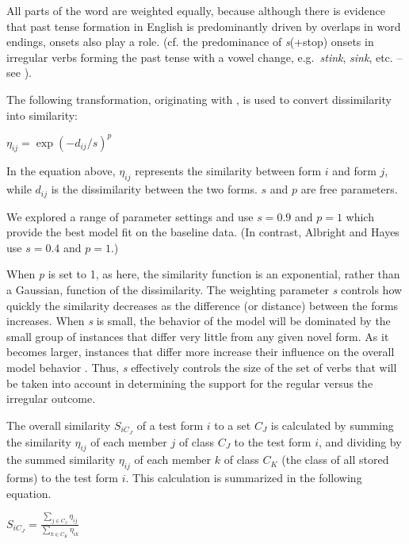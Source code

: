 \documentclass[12pt]{article}
\begin{document}
All parts of the word are weighted equally, because although there is evidence that past tense formation in English is predominantly driven by overlaps in word endings, onsets also play a role. (cf. the predominance of \emph {s}(+stop) onsets in irregular verbs forming the past tense with a vowel change, e.g.\ {\em stink}, {\em sink}, etc. -- see \citealt{bybee1983morphological}). 

The following transformation, originating with \cite{nosofsky1990relations}, is used to convert dissimilarity into similarity:

\vspace{1cm}
$\eta_{ij} = \exp {(- d_{ij} /s)^p}$
\vspace{1cm}

In the equation above, $\eta_{ij}$ represents the similarity between form $i$ and form $j$, while  $d_{ij}$ is the dissimilarity between the two forms. $s$ and $p$ are free parameters.  

We explored a range of parameter settings and use $s = 0.9$ and $p = 1$ which provide the best model fit on the baseline data. (In contrast, Albright and Hayes use $s = 0.4$ and $p = 1$.)

When {\em p} is set to 1, as here, the similarity function is an exponential, rather than a Gaussian, function of the dissimilarity. The weighting parameter {\em s} controls how quickly the similarity decreases as the difference (or distance) between the forms increases. When {\em s} is small, the behavior of the model will be dominated by the small group of instances that differ very little from any given novel form. As it becomes larger, instances that differ more increase their influence on the overall model behavior
 \citep{nosofsky1990relations,nakisa2001dual,albright2003rules,dawdy2014learnability}. Thus, {\em s} effectively controls the size of the set of verbs that will be taken into account in determining the support for the regular versus the irregular outcome.

The overall similarity $S_{iC_J}$ of a test form $i$ to a set
$C_J$ is calculated by summing the similarity $\eta_{ij}$ of each member $j$ of class $C_J$ to the test form $i$, and dividing by the summed similarity $\eta_{ij}$ of each member $k$ of class $C_K$ (the class of all stored forms) to the test form $i$. 
This calculation is summarized in the following equation.

\vspace{1cm}
$S_{iC_J} = \frac{{\sum_{j \in C_J } \eta_{ij} } }{{\sum_{k\in C_K } \eta_{ik} }}$
\vspace{1cm}
\end{document}
